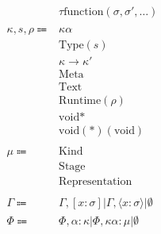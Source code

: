 \documentclass {article}
\begin{document}
\begin{align*}
& \tau \text{function}(\sigma, \sigma', \dots) \tag*{[Function Literal Type]} \\
\\
\kappa, s, \rho \Coloneqq &  \kappa \alpha \tag*{[Kind Variable]} \\
& \text{Type} (s) \tag*{[Type]} \\
& \kappa \to \kappa' \tag*{[Higher Kinded Type]} \\
& \text{Meta} \tag*{[Meta Stage]}\\
& \text{Text} \tag*{[Symbol Stage]} \\
& \text{Runtime} (\rho) \tag*{[Runtime Stage]}\\
& \text{void}* \tag*{[Pointer Representation]}\\
& \text{void}(*)(\text{void}) \tag*{[Function Pointer Representation]}\\
\\
\mu \Coloneqq & \text{Kind} \\
& \text{Stage} \\
& \text{Representation} \\
\\
\Gamma \Coloneqq & \Gamma, [x : \sigma] | \Gamma, \langle x : \sigma \rangle | \emptyset \\
\Phi \Coloneqq & \Phi, \alpha : \kappa | \Phi, \kappa \alpha : \mu |  \emptyset \\
\end{align*}
\end{document}
